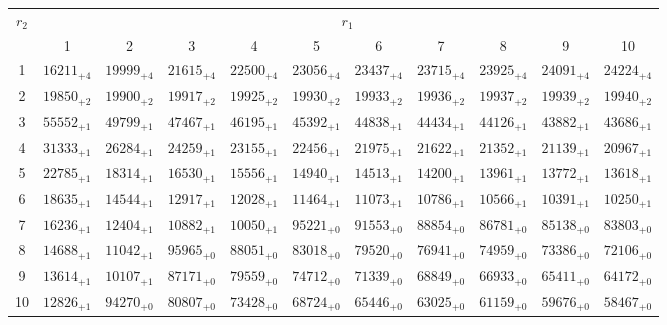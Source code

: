 \documentclass[10pt, a4paper]{article}
\begin{document}
\begin{center}
    \begin{tabular}{c || c c c c c | c c c c c}
        \multirow{2}{*}{\(r_2\)} & \multicolumn{10}{c}{\(r_1\)} \\
        & 1 & 2 & 3 & 4 & 5 & 6 & 7 & 8 & 9 & 10\\
        \hline\hline
        1 & \({16211}_{+4}\) & \({19999}_{+4}\) & \({21615}_{+4}\) & \({22500}_{+4}\) & \({23056}_{+4}\) & \({23437}_{+4}\) & \({23715}_{+4}\) & \({23925}_{+4}\) & \({24091}_{+4}\) & \({24224}_{+4}\)\\
        2 & \({19850}_{+2}\) & \({19900}_{+2}\) & \({19917}_{+2}\) & \({19925}_{+2}\) & \({19930}_{+2}\) & \({19933}_{+2}\) & \({19936}_{+2}\) & \({19937}_{+2}\) & \({19939}_{+2}\) & \({19940}_{+2}\)\\
        3 & \({55552}_{+1}\) & \({49799}_{+1}\) & \({47467}_{+1}\) & \({46195}_{+1}\) & \({45392}_{+1}\) & \({44838}_{+1}\) & \({44434}_{+1}\) & \({44126}_{+1}\) & \({43882}_{+1}\) & \({43686}_{+1}\)\\
        4 & \({31333}_{+1}\) & \({26284}_{+1}\) & \({24259}_{+1}\) & \({23155}_{+1}\) & \({22456}_{+1}\) & \({21975}_{+1}\) & \({21622}_{+1}\) & \({21352}_{+1}\) & \({21139}_{+1}\) & \({20967}_{+1}\)\\
        5 & \({22785}_{+1}\) & \({18314}_{+1}\) & \({16530}_{+1}\) & \({15556}_{+1}\) & \({14940}_{+1}\) & \({14513}_{+1}\) & \({14200}_{+1}\) & \({13961}_{+1}\) & \({13772}_{+1}\) & \({13618}_{+1}\)\\
        \hline
        6 & \({18635}_{+1}\) & \({14544}_{+1}\) & \({12917}_{+1}\) & \({12028}_{+1}\) & \({11464}_{+1}\) & \({11073}_{+1}\) & \({10786}_{+1}\) & \({10566}_{+1}\) & \({10391}_{+1}\) & \({10250}_{+1}\)\\
        7 & \({16236}_{+1}\) & \({12404}_{+1}\) & \({10882}_{+1}\) & \({10050}_{+1}\) & \({95221}_{+0}\) & \({91553}_{+0}\) & \({88854}_{+0}\) & \({86781}_{+0}\) & \({85138}_{+0}\) & \({83803}_{+0}\)\\
        8 & \({14688}_{+1}\) & \({11042}_{+1}\) & \({95965}_{+0}\) & \({88051}_{+0}\) & \({83018}_{+0}\) & \({79520}_{+0}\) & \({76941}_{+0}\) & \({74959}_{+0}\) & \({73386}_{+0}\) & \({72106}_{+0}\)\\
        9 & \({13614}_{+1}\) & \({10107}_{+1}\) & \({87171}_{+0}\) & \({79559}_{+0}\) & \({74712}_{+0}\) & \({71339}_{+0}\) & \({68849}_{+0}\) & \({66933}_{+0}\) & \({65411}_{+0}\) & \({64172}_{+0}\)\\
        10 & \({12826}_{+1}\) & \({94270}_{+0}\) & \({80807}_{+0}\) & \({73428}_{+0}\) & \({68724}_{+0}\) & \({65446}_{+0}\) & \({63025}_{+0}\) & \({61159}_{+0}\) & \({59676}_{+0}\) & \({58467}_{+0}\)\\

\end{tabular}
\end{center}
\end{document}
